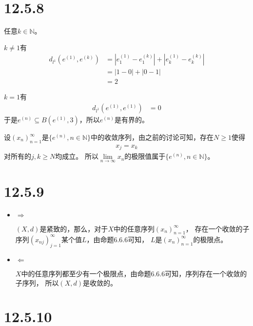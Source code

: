 \documentclass{article}
\begin{document}
\section*{12.5.8}

任意$k \in \mathbb{N}$。

$k \not = 1$有
\begin{align*}
  d_{l^1}(e^{(1)}, e^{(k)}) & = |e_1^{(1)} - e_1^{(k)}| + |e_k^{(1)} - e_k^{(k)}| \\
                            & = |1 - 0| + |0 - 1|                                 \\
                            & = 2
\end{align*}

$k = 1$有
\begin{align*}
  d_{l^1}(e^{(1)}, e^{(1)}) & = 0
\end{align*}
于是$e^{(n)} \subseteq B(e^{(1)}, 3)$，所以$e^{(n)}$是有界的。

设$(x_n)_{n = 1}^\infty$是$\{e^{(n)}, n \in \mathbb{N}\}$中的收敛序列，由之前的讨论可知，存在$N \geq 1$使得
\begin{align*}
  x_j = x_k
\end{align*}
对所有的$j,k \geq N$均成立。
所以$\lim\limits_{n \to \infty} x_n$的极限值属于$\{e^{(n)}, n \in \mathbb{N}\}$。

\section*{12.5.9}

\begin{itemize}
  \item $\Rightarrow$

        $(X,d)$是紧致的，那么，对于$X$中的任意序列$(x_n)_{n = 1}^\infty$，
        存在一个收敛的子序列$(x_{nj})_{j = 1}^\infty$某个值$L$，由命题6.6.6可知，
        $L$是$(x_n)_{n = 1}^\infty$的极限点。


  \item $\Leftarrow$

        $X$中的任意序列都至少有一个极限点，由命题6.6.6可知，序列存在一个收敛的子序列，
        所以$(X,d)$是收敛的。
\end{itemize}

\section*{12.5.10}
\end{document}
